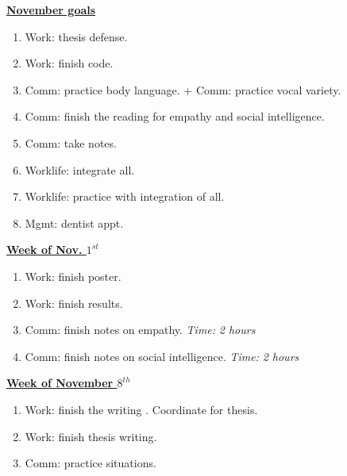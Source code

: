 \documentclass[serif, mathserif, final]{beamer}
\newcommand{\timeEst}[1]{\textit{Time:} \textit{#1}}
\begin{document}
{\begin{frame} {}
\begin{columns}
\begin{column}{0.27\linewidth}
\begin{block}{\underline{\textbf{November goals}}}
\begin{enumerate}
\item \small Work: thesis defense. 
\item \small Work: finish code. 
\item \small Comm: practice body language. + Comm: practice vocal variety. 
\item \small Comm: finish the reading for empathy and social intelligence. 
\item \small Comm: take notes. 
\item \small Worklife: integrate all. 
\item \small Worklife: practice with integration of all. 
\item \small Mgmt: dentist appt. 
\end{enumerate}
\end{block}

\begin{block}{\small \underline{\textbf{Week of Nov. $1^{st}$}}}
\begin{enumerate}
\tiny \item \tiny Work: finish poster. 
\item \tiny Work: finish results. 
\item \tiny Comm: finish notes on empathy. \timeEst{2 hours} 
\item \tiny Comm: finish notes on social intelligence. \timeEst{2 hours} 
\end{enumerate}
\end{block}

\begin{block}{\small \underline{\textbf{Week of November $8^{th}$}}}
\begin{enumerate}
\tiny \item \tiny Work: finish the writing . Coordinate for thesis. 
\item \tiny  Work: finish thesis writing. 
\item \tiny  Comm: practice situations.
\end{enumerate}
\end{block}


\end{column}
\end{columns}
\end{frame}}
\end{document}
